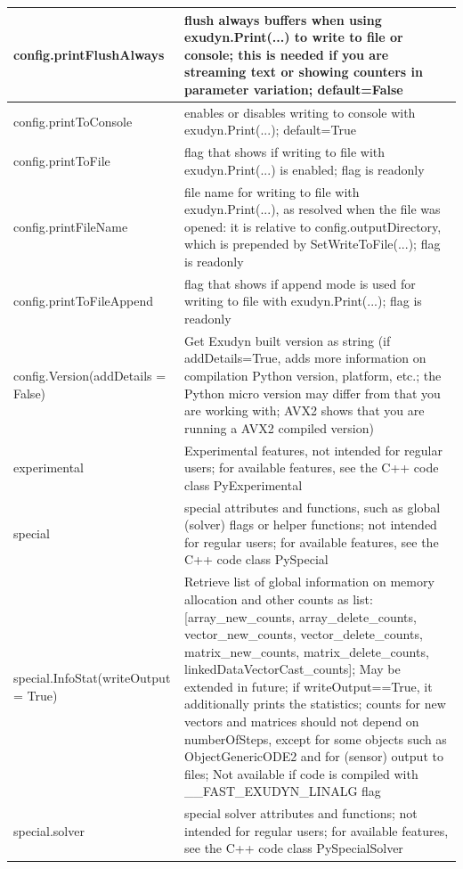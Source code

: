 \begin{center}
\begin{longtable}{| p{8cm} | p{8cm} |}
  config.printFlushAlways & flush always buffers when using exudyn.Print(...) to write to file or console; this is needed if you are streaming text or showing counters in parameter variation; default=False\\ \hline  
  config.printToConsole & enables or disables writing to console with exudyn.Print(...); default=True\\ \hline  
  config.printToFile & flag that shows if writing to file with exudyn.Print(...) is enabled; flag is readonly\\ \hline  
  config.printFileName & file name for writing to file with exudyn.Print(...), as resolved when the file was opened: it is relative to config.outputDirectory, which is prepended by SetWriteToFile(...); flag is readonly\\ \hline  
  config.printToFileAppend & flag that shows if append mode is used for writing to file with exudyn.Print(...); flag is readonly\\ \hline  
  config.Version(addDetails = False) & Get Exudyn built version as string (if addDetails=True, adds more information on compilation Python version, platform, etc.; the Python micro version may differ from that you are working with; AVX2 shows that you are running a AVX2 compiled version)\\ \hline 
  experimental & Experimental features, not intended for regular users; for available features, see the C++ code class PyExperimental\\ \hline  
  special & special attributes and functions, such as global (solver) flags or helper functions; not intended for regular users; for available features, see the C++ code class PySpecial\\ \hline  
  special.InfoStat(writeOutput = True) & Retrieve list of global information on memory allocation and other counts as list:[array\_new\_counts, array\_delete\_counts, vector\_new\_counts, vector\_delete\_counts, matrix\_new\_counts, matrix\_delete\_counts, linkedDataVectorCast\_counts]; May be extended in future; if writeOutput==True, it additionally prints the statistics; counts for new vectors and matrices should not depend on numberOfSteps, except for some objects such as ObjectGenericODE2 and for (sensor) output to files; Not available if code is compiled with \_\_FAST\_EXUDYN\_LINALG flag\\ \hline 
  special.solver & special solver attributes and functions; not intended for regular users; for available features, see the C++ code class PySpecialSolver\\ \hline  

\end{longtable}
\end{center}
